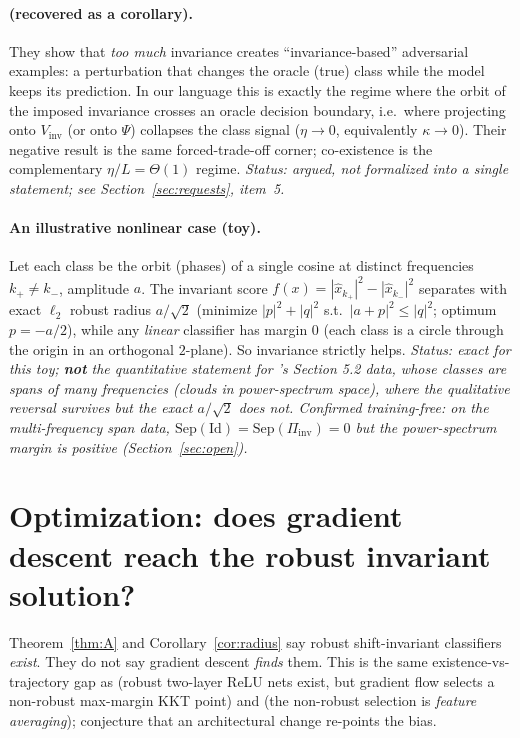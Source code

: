 \documentclass[11pt]{article}
\theoremstyle{plain}
\theoremstyle{definition}
\theoremstyle{remark}
\newcommand{\Vinv}{V_{\mathrm{inv}}}
\newcommand{\Sep}{\mathrm{Sep}}
\newcommand{\Piinv}{\Pi_{\mathrm{inv}}}
\begin{document}
\paragraph{\citet{tramer2020fundamental} (recovered as a corollary).} They show that \emph{too much} invariance creates ``invariance-based'' adversarial examples: a perturbation that changes the oracle (true) class while the model keeps its prediction. In our language this is exactly the regime where the orbit of the imposed invariance crosses an oracle decision boundary, i.e.\ where projecting onto $\Vinv$ (or onto $\Psi$) collapses the class signal ($\eta\to0$, equivalently $\kappa\to0$). Their negative result is the same forced-trade-off corner; co-existence is the complementary $\eta/L=\Theta(1)$ regime. \emph{Status: argued, not formalized into a single statement; see Section~\ref{sec:requests}, item~5.}

\paragraph{An illustrative nonlinear case (toy).}
Let each class be the orbit (phases) of a single cosine at distinct frequencies $k_+\neq k_-$, amplitude $a$. The invariant score $f(x)=|\hat x_{k_+}|^2-|\hat x_{k_-}|^2$ separates with exact $\ell_2$ robust radius $a/\sqrt2$ (minimize $|p|^2+|q|^2$ s.t.\ $|a+p|^2\le|q|^2$; optimum $p=-a/2$), while any \emph{linear} classifier has margin $0$ (each class is a circle through the origin in an orthogonal $2$-plane). So invariance strictly helps. \emph{Status: exact for this toy; \textbf{not} the quantitative statement for \citet{ge2021shift}'s Section 5.2 data, whose classes are spans of many frequencies (clouds in power-spectrum space), where the qualitative reversal survives but the exact $a/\sqrt2$ does not. Confirmed training-free: on the multi-frequency span data, $\Sep(\mathrm{Id})=\Sep(\Piinv)=0$ but the power-spectrum margin is positive (Section~\ref{sec:open}).}

\section{Optimization: does gradient descent reach the robust invariant solution?}\label{sec:opt}
Theorem~\ref{thm:A} and Corollary~\ref{cor:radius} say robust shift-invariant classifiers \emph{exist}. They do not say gradient descent \emph{finds} them. This is the same existence-vs-trajectory gap as \citet{frei2023double} (robust two-layer ReLU nets exist, but gradient flow selects a non-robust max-margin KKT point) and \citet{li2025feature} (the non-robust selection is \emph{feature averaging}); \citet{min2024can} conjecture that an architectural change re-points the bias.
\end{document}
